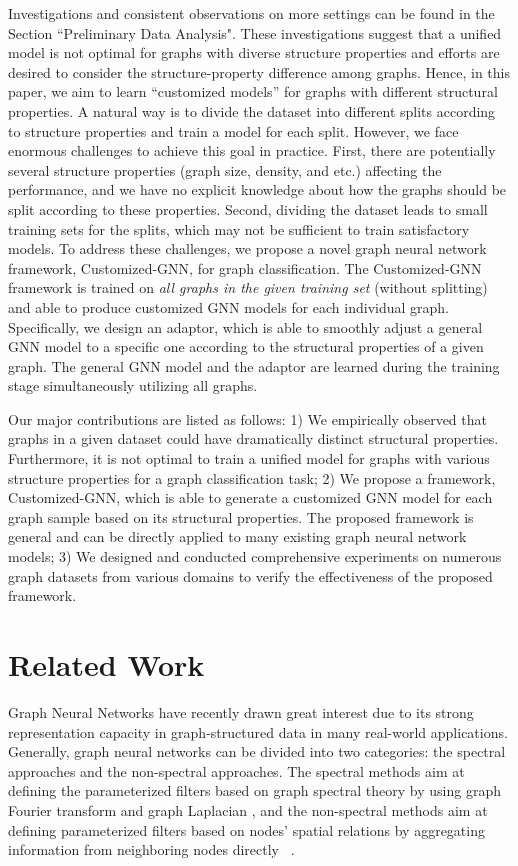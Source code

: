 \documentclass[11pt,dvipdfm]{article}
\begin{document}
Investigations and consistent observations on more settings can be found in the Section ``Preliminary Data Analysis". 
These investigations suggest that a unified model is not optimal for graphs with diverse structure properties and efforts are desired to consider the structure-property difference among graphs. Hence, in this paper, we aim to learn ``customized models'' for graphs with different structural properties. 
A natural way is to divide the dataset into different splits according to structure properties and train a model for each split. However, we face enormous challenges to achieve this goal in practice. First, there are potentially several structure properties (graph size, density, and etc.) affecting the performance, and we have no explicit knowledge about how the graphs should be split according to these properties. Second, dividing the dataset leads to small training sets for the splits, which may not be sufficient to train satisfactory models.
To address these challenges, we propose a novel graph neural network framework, Customized-GNN, for graph classification. The Customized-GNN framework is trained on \emph{all graphs in the given training set} (without splitting) and able to produce customized GNN models for each individual graph. Specifically, we design an adaptor, which is able to smoothly adjust a general GNN model to a specific one according to the structural properties of a given graph. The general GNN model and the adaptor are learned during the training stage simultaneously utilizing all graphs. 

Our major contributions are listed as follows: 1) We empirically observed that graphs in a given dataset could have dramatically distinct structural properties. Furthermore, it is not optimal to train a unified model for graphs with various structure properties for a graph classification task;
2) We propose a framework, Customized-GNN, which is able to generate a customized GNN model for each graph sample based on its structural properties. The proposed framework is general and can be directly applied to many existing graph neural network models;
3) We designed and conducted comprehensive experiments on numerous graph datasets from various domains to verify the effectiveness of the proposed framework.

\section{Related Work}\label{sec:related work}
Graph Neural Networks have recently drawn great interest due to its strong representation capacity in graph-structured data in many real-world applications. Generally, graph neural networks can be divided into two categories: the spectral approaches and the non-spectral approaches. The spectral methods aim at defining the parameterized filters based on graph spectral theory by using graph Fourier transform and graph Laplacian \cite{BrunaZSL13,defferrard2016convolutional,li2018adaptive,KipfW17}, and the non-spectral methods aim at defining parameterized filters based on nodes' spatial relations by aggregating information from neighboring nodes directly ~\cite{hamilton2017inductive,VelickovicCCRLB18}. 
\end{document}
